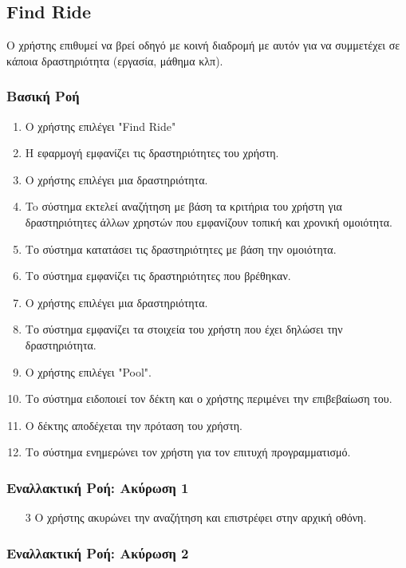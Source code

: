 \subsection{Find Ride}

Ο χρήστης επιθυμεί να βρεί οδηγό με κοινή διαδρομή με αυτόν για να συμμετέχει σε
κάποια δραστηριότητα (εργασία, μάθημα κλπ).

\subsubsection{Βασική Ροή}
\begin{enumerate}
    \item Ο χρήστης επιλέγει "Find Ride"
    \item Η εφαρμογή εμφανίζει τις δραστηριότητες του χρήστη.
    \item Ο χρήστης επιλέγει μια δραστηριότητα.
    \item To σύστημα εκτελεί αναζήτηση με βάση τα κριτήρια του χρήστη για δραστηριότητες
          άλλων χρηστών που εμφανίζουν τοπική και χρονική ομοιότητα.
    \item Το σύστημα κατατάσει τις δραστηριότητες με βάση την ομοιότητα.
    \item Το σύστημα εμφανίζει τις δραστηριότητες που βρέθηκαν.
    \item Ο χρήστης επιλέγει μια δραστηριότητα.
    \item Το σύστημα εμφανίζει τα στοιχεία του χρήστη που έχει δηλώσει την δραστηριότητα.
    \item Ο χρήστης επιλέγει "Pool".
    \item Το σύστημα ειδοποιεί τον δέκτη και ο χρήστης περιμένει την επιβεβαίωση του.
    \item O δέκτης αποδέχεται την πρόταση του χρήστη.
    \item Το σύστημα ενημερώνει τον χρήστη για τον επιτυχή προγραμματισμό.
\end{enumerate}

\subsubsection{Εναλλακτική Ροή: Ακύρωση 1}

\begin{enumerate}
    \item[3] Ο χρήστης ακυρώνει την αναζήτηση και επιστρέφει στην αρχική οθόνη.
\end{enumerate}

\subsubsection{Εναλλακτική Ροή: Ακύρωση 2}

